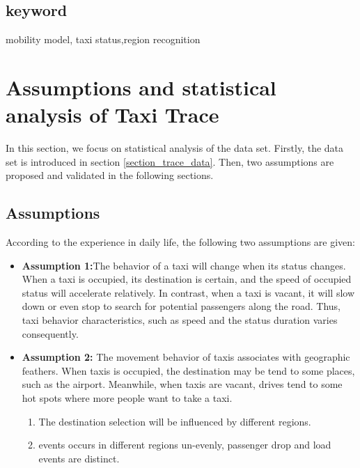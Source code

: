 \documentclass[camera-ready,twocolumn,10pt]{IEEEtran}
\begin{document}
\subsection*{keyword}
mobility model, taxi status,region recognition




\section{Assumptions and statistical analysis of Taxi Trace}
\label{section_assumptions_anlysis}

In this section, we focus on statistical analysis of the data set.
Firstly, the data set is introduced in section \ref{section_trace_data}. Then, two assumptions are proposed and validated in the following sections.



\subsection{Assumptions}
\label{section_statistic_analysis}
According to the experience in daily life, the following two assumptions are given:

\begin{itemize}
  \item \textbf{Assumption 1:}The behavior of a taxi will change when its status changes. When a taxi is occupied, its destination is certain, and the speed of occupied status will accelerate relatively. In contrast, when a taxi is vacant, it will slow down or even stop to search for potential passengers along the road. Thus, taxi behavior characteristics, such as speed and the status duration varies consequently.

  \item \textbf{Assumption 2:} The movement behavior of taxis associates with geographic feathers. When taxis is occupied, the destination may be tend to some places, such as the airport. Meanwhile, when taxis are vacant, drives tend to some hot spots where more people want to take a taxi.
      \begin{enumerate}
        \item The destination selection will be influenced by different regions.
        \item events occurs in different regions un-evenly, passenger drop and load events are distinct.
      \end{enumerate}
\end{itemize}
\end{document}
